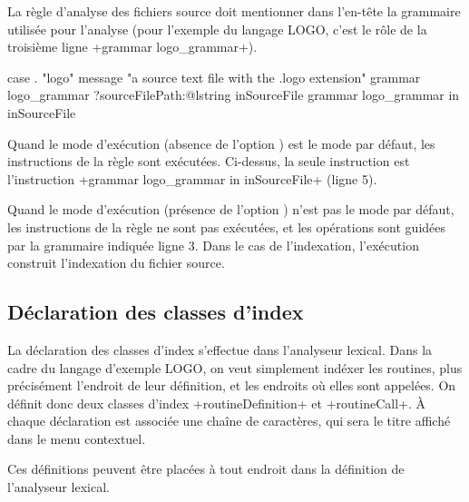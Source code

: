 La règle d'analyse des fichiers source doit mentionner dans l'en-tête la grammaire utilisée pour l'analyse (pour l'exemple du langage LOGO, c'est le rôle de la troisième ligne \ggsq+grammar logo_grammar+).

\begin{galgas4}
case . "logo"
message "a source text file with the .logo extension"
grammar logo_grammar
?sourceFilePath:@lstring inSourceFile {
  grammar logo_grammar in inSourceFile
}
\end{galgas4}

Quand le mode d'exécution (absence de l'option ) est le mode par défaut, les instructions de la règle sont exécutées. Ci-dessus, la seule instruction est l'instruction \ggsq+grammar logo_grammar in inSourceFile+ (ligne 5).

Quand le mode d'exécution (présence de l'option ) n'est pas le mode par défaut, les instructions de la règle ne sont pas exécutées, et les opérations sont guidées par la grammaire indiquée ligne 3. Dans le cas de l'indexation, l'exécution construit l'indexation du fichier source.









\subsection{Déclaration des classes d'index}

La déclaration des classes d'index s'effectue dans l'analyseur lexical. Dans la cadre du langage d'exemple LOGO, on veut simplement indéxer les routines, plus précisément l'endroit de leur définition, et les endroits où elles sont appelées. On définit donc deux classes d'index \ggsq+routineDefinition+ et \ggsq+routineCall+. À chaque déclaration est associée une chaîne de caractères, qui sera le titre affiché dans le menu contextuel.


\begin{galgas4}
lexique logo_lexique indexing in "INDEXING" {
  ...
indexing routineDefinition : "Routine Definition"
  ...
indexing routineCall : "Routine call"
  ...
\end{galgas4}


Ces définitions peuvent être placées à tout endroit dans la définition de l'analyseur lexical.








